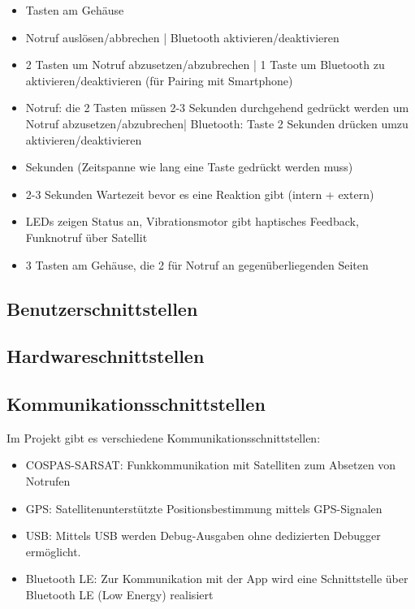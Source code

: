 \begin{itemize}
	\item Tasten am Gehäuse
	\item Notruf auslösen/abbrechen | Bluetooth aktivieren/deaktivieren
	\item 2 Tasten um Notruf abzusetzen/abzubrechen | 1 Taste um Bluetooth zu aktivieren/deaktivieren (für Pairing mit Smartphone) 
	\item  Notruf: die 2 Tasten müssen 2-3 Sekunden durchgehend gedrückt werden um Notruf abzusetzen/abzubrechen| Bluetooth: Taste 2 Sekunden drücken umzu aktivieren/deaktivieren 
	\item Sekunden (Zeitspanne wie lang eine Taste gedrückt werden muss) 
	\item  2-3 Sekunden Wartezeit bevor es eine Reaktion gibt (intern + extern) 
	\item  LEDs zeigen Status an, Vibrationsmotor gibt haptisches Feedback, Funknotruf über Satellit 
	\item  3 Tasten am Gehäuse, die 2 für Notruf an gegenüberliegenden Seiten 
\end{itemize}

\subsection{Benutzerschnittstellen}

\subsection{Hardwareschnittstellen}

\subsection{Kommunikationsschnittstellen}

Im Projekt gibt es verschiedene Kommunikationsschnittstellen:
\begin{itemize}
	\item COSPAS-SARSAT: Funkkommunikation mit Satelliten zum Absetzen von Notrufen
	\item GPS: Satellitenunterstützte Positionsbestimmung mittels GPS-Signalen
	\item USB: Mittels USB werden Debug-Ausgaben ohne dedizierten Debugger ermöglicht.
	\item Bluetooth LE: Zur Kommunikation mit der App wird eine Schnittstelle über Bluetooth LE (Low Energy) realisiert	
\end{itemize}

